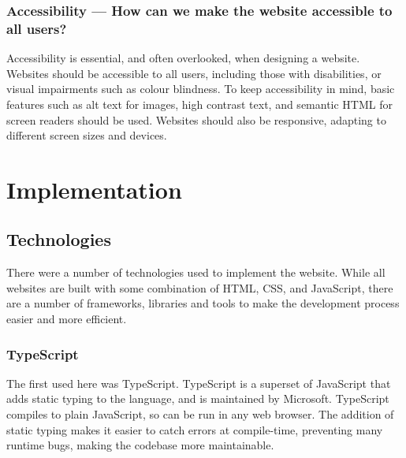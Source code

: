 \documentclass[../main.tex]{subfiles}
\begin{document}
            \subsubsection{Accessibility — How can we make the website accessible to all users?}
                Accessibility is essential, and often overlooked, when designing a website.
                Websites should be accessible to all users, including those with disabilities,
                    or visual impairments such as colour blindness.
                To keep accessibility in mind, basic features such as alt text for images, high
                    contrast text, and semantic HTML for screen readers should be used.
                Websites should also be responsive, adapting to different screen sizes and
                    devices.

    \section{Implementation}
        \subsection{Technologies}
            There were a number of technologies used to implement the website.
            While all websites are built with some combination of HTML, CSS, and
                JavaScript, there are a number of frameworks, libraries and tools to make the
                development process easier and more efficient.

            \subsubsection{TypeScript}
                The first used here was TypeScript.
                TypeScript is a superset of JavaScript that adds static typing to the language,
                    and is maintained by Microsoft.
                TypeScript compiles to plain JavaScript, so can be run in any web browser.
                The addition of static typing makes it easier to catch errors at compile-time,
                    preventing many runtime bugs, making the codebase more maintainable.
\end{document}
